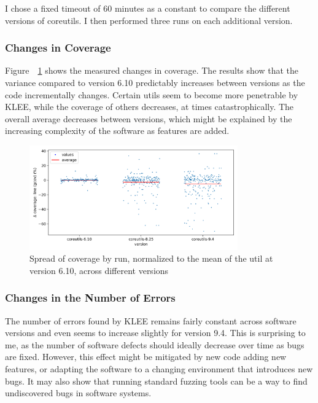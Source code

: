 \documentclass{article}
\let\savedRef=\ref
\renewcommand{\ref}{\unskip~\savedRef}
\begin{document}
I chose a fixed timeout of 60 minutes as a constant to compare the different versions of coreutils. I then performed three runs on each additional version.

\subsubsection{Changes in Coverage}

Figure~\ref{fig:spread_across_versions_gcov} shows the measured changes in coverage. The results show that the variance compared to version 6.10 predictably increases between versions as the code incrementally changes. Certain utils seem to become more penetrable by KLEE, while the coverage of others decreases, at times catastrophically. The overall average decreases between versions, which might be explained by the increasing complexity of the software as features are added.

\begin{figure}[htbp]
    \centering
    \includegraphics[width=0.8\textwidth]{../plots/gcov_cov/changes-by-version.png}
    \captionsetup{width=0.6\textwidth}
    \caption{Spread of coverage by run, normalized to the mean of the util at version 6.10, across different versions}
    \label{fig:spread_across_versions_gcov}
\end{figure}

\subsubsection{Changes in the Number of Errors}

The number of errors found by KLEE remains fairly constant across software versions and even seems to increase slightly for version 9.4. This is surprising to me, as the number of software defects should ideally decrease over time as bugs are fixed. However, this effect might be mitigated by new code adding new features, or adapting the software to a changing environment that introduces new bugs. It may also show that running standard fuzzing tools can be a way to find undiscovered bugs in software systems.
\end{document}

